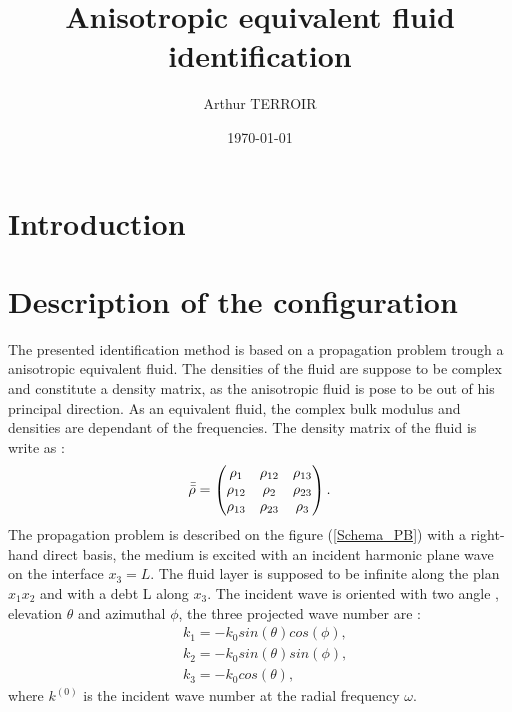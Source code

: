 \documentclass{article}
\title{Anisotropic equivalent fluid identification}
\author{Arthur TERROIR}
\date{\today}
\begin{document}
\maketitle

\section{Introduction}


\section{Description of the configuration}
    The presented identification method is based on a propagation problem trough a anisotropic equivalent fluid. The densities of the fluid are suppose to be complex and constitute a density matrix, as the anisotropic fluid is pose to be out of his principal direction. As an equivalent fluid, the complex bulk modulus and densities are dependant of the frequencies. The density matrix of the fluid is write as : 
    \begin{align}
        \Bar{\Bar{\rho}}=\begin{pmatrix}
    					\rho_{1} & \rho_{12} & \rho_{13} \\
                        \rho_{12} & \rho_{2} & \rho_{23} \\
                        \rho_{13} & \rho_{23} & \rho_{3}
                        \end{pmatrix}\label{Density_tensor}.
    \end{align}
    The propagation problem is described on the figure (\ref{Schema_PB}) with a right-hand direct basis, the medium is excited with an incident harmonic plane wave on the interface $x_3=L$. The fluid layer is supposed to be infinite along the plan $x_1x_2$ and with a debt L along $x_3$. The incident wave is oriented with two angle , elevation $\theta$ and azimuthal $\phi$, the three projected wave number are :   
   \begin{align}
    &k_1=-k_0 sin(\theta) cos(\phi),\label{k1} \\
    &k_2=-k_0 sin(\theta) sin(\phi),\label{k2} \\
    &k_3= -k_0 cos(\theta),\label{k3}
    \end{align}
    where $k^{(0)}$ is the incident wave number at the radial frequency $\omega$. 
    
\end{document}
